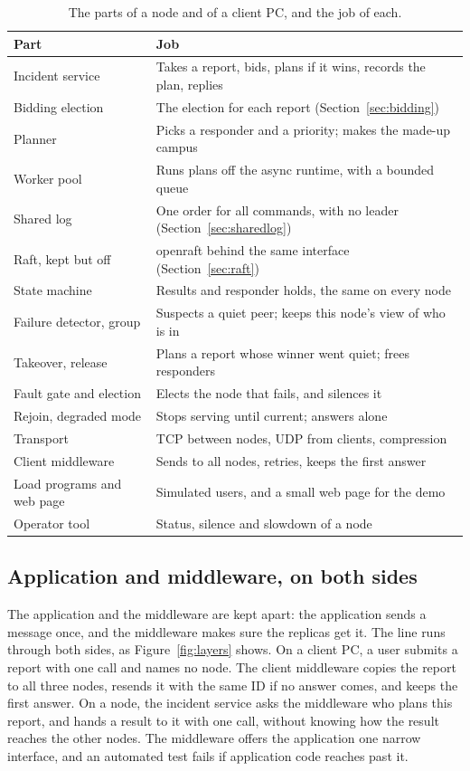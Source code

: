 \begin{table}[!htb]
\centering\small
\caption{The parts of a node and of a client PC, and the job of each.}
\label{tab:modules}
\begin{tabularx}{\linewidth}{@{}P{4.2cm}L@{}}
\toprule
Part & Job \\
\midrule
Incident service & Takes a report, bids, plans if it wins, records the plan, replies \\
Bidding election & The election for each report (Section~\ref{sec:bidding}) \\
Planner & Picks a responder and a priority; makes the made-up campus \\
Worker pool & Runs plans off the async runtime, with a bounded queue \\
Shared log & One order for all commands, with no leader (Section~\ref{sec:sharedlog}) \\
Raft, kept but off & openraft behind the same interface (Section~\ref{sec:raft}) \\
State machine & Results and responder holds, the same on every node \\
Failure detector, group & Suspects a quiet peer; keeps this node's view of who is in \\
Takeover, release & Plans a report whose winner went quiet; frees responders \\
Fault gate and election & Elects the node that fails, and silences it \\
Rejoin, degraded mode & Stops serving until current; answers alone \\
Transport & TCP between nodes, UDP from clients, compression \\
Client middleware & Sends to all nodes, retries, keeps the first answer \\
Load programs and web page & Simulated users, and a small web page for the demo \\
Operator tool & Status, silence and slowdown of a node \\
\bottomrule
\end{tabularx}
\end{table}

\subsection{Application and middleware, on both sides}
\label{sec:layers}

The application and the middleware are kept apart: the application sends a message once, and the middleware makes sure the replicas get it. The line runs through both sides, as Figure~\ref{fig:layers} shows. On a client PC, a user submits a report with one call and names no node. The client middleware copies the report to all three nodes, resends it with the same ID if no answer comes, and keeps the first answer. On a node, the incident service asks the middleware who plans this report, and hands a result to it with one call, without knowing how the result reaches the other nodes. The middleware offers the application one narrow interface, and an automated test fails if application code reaches past it.

